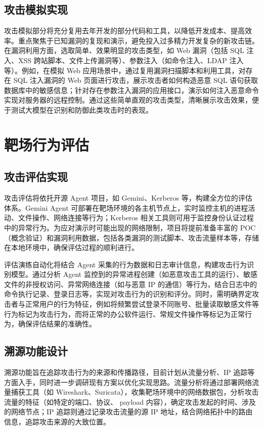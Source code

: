 \documentclass[lang=cn,10pt]{elegantbook}
\begin{document}
\subsection{攻击模拟实现}
攻击模拟部分将充分复用去年开发的部分代码和工具，以降低开发成本、提高效率。重点聚焦于已知漏洞的复现和演示，避免投入过多精力开发复杂的新攻击链。在漏洞利用方面，选取简单、效果明显的攻击类型，如 Web 漏洞（包括 SQL 注入、XSS 跨站脚本、文件上传漏洞等）、参数注入（如命令注入、LDAP 注入等）。例如，在模拟 Web 应用场景中，通过复用漏洞扫描脚本和利用工具，对存在 SQL 注入漏洞的 Web 页面进行攻击，展示攻击者如何构造恶意 SQL 语句获取数据库中的敏感信息；针对存在参数注入漏洞的应用接口，演示如何注入恶意命令实现对服务器的远程控制。通过这些简单直观的攻击类型，清晰展示攻击效果，便于测试大模型在识别和防御此类攻击时的表现。

\section{靶场行为评估}
\subsection{攻击评估实现}
攻击评估将依托开源 Agent 项目，如 Gemini、Kerberos 等，构建全方位的评估体系。Gemini Agent 可部署在靶场环境的各主机节点上，实时监控主机的进程活动、文件操作、网络连接等行为；Kerberos 相关工具则可用于监控身份认证过程中的异常行为。为应对演示时可能出现的网络限制，项目将提前准备丰富的 POC（概念验证）和漏洞利用数据，包括各类漏洞的测试脚本、攻击流量样本等，存储在本地环境中，确保评估过程的顺利进行。​

评估演练自动化将结合 Agent 采集的行为数据和日志审计信息，构建攻击行为识别模型。通过分析 Agent 监控到的异常进程创建（如恶意攻击工具的运行）、敏感文件的非授权访问、异常网络连接（如与恶意 IP 的通信）等行为，结合日志中的命令执行记录、登录日志等，实现对攻击行为的识别和评分。同时，需明确界定攻击者与正常用户的行为特征，例如将频繁尝试登录不同账号、批量读取敏感文件等行为标记为攻击行为，而将正常的办公软件运行、常规文件操作等标记为正常行为，确保评估结果的准确性。

\subsection{溯源功能设计}
溯源功能旨在追踪攻击行为的来源和传播路径，目前计划从流量分析、IP 追踪等方面入手，同时进一步调研现有方案以优化实现思路。流量分析将通过部署网络流量捕获工具（如 Wireshark、Suricata），收集靶场环境中的网络数据包，分析攻击流量的特征（如特定的端口、协议、 payload 内容），确定攻击发起的时间、涉及的网络节点；IP 追踪则通过记录攻击流量的源 IP 地址，结合网络拓扑中的路由信息，追踪攻击来源的大致位置。​
\end{document}

